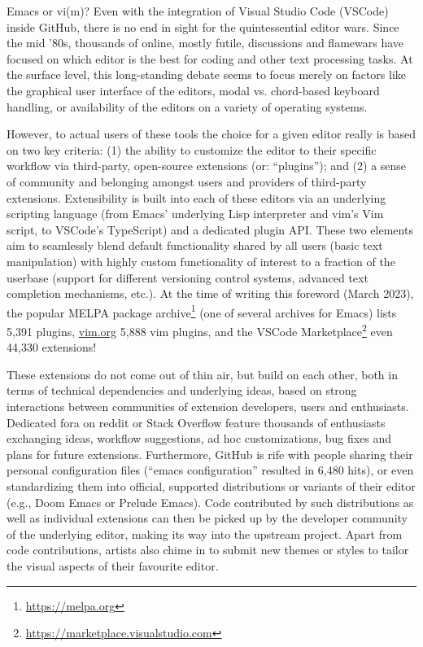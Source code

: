 %
%

\foreword

Emacs or vi(m)? Even with the integration of Visual Studio Code (VSCode) inside GitHub, there is no end in sight for the quintessential editor wars. Since the mid '80s, thousands of online, mostly futile, discussions and flamewars have focused on which editor is the best for coding and other text processing tasks. At the surface level, this long-standing debate seems to focus merely on factors like the graphical user interface of the editors, modal vs. chord-based keyboard handling, or availability of the editors on a variety of operating systems. 

However, to actual users of these tools the choice for a given editor really is based on two key criteria: (1) the ability to customize the editor to their specific workflow via third-party, open-source extensions (or: ``plugins''); and (2) a sense of community and belonging amongst users and providers of third-party extensions. Extensibility is built into each of these editors via an underlying scripting language (from Emacs' underlying Lisp interpreter and vim's Vim script, to VSCode's TypeScript) and a dedicated plugin API. These two elements aim to seamlessly blend default functionality shared by all users (basic text manipulation) with highly custom functionality of interest to a fraction of the userbase (support for different versioning control systems, advanced text completion mechanisms, etc.). At the time of writing this foreword (March 2023), the popular MELPA package archive\footnote{\url{https://melpa.org}} (one of several archives for Emacs) lists 5,391 plugins, \url{vim.org} 5,888 vim plugins, and the VSCode Marketplace\footnote{\url{https://marketplace.visualstudio.com}} even 44,330 extensions!

These extensions do not come out of thin air, but build on each other, both in terms of technical dependencies and underlying ideas, based on strong interactions between communities of extension developers, users and enthusiasts. Dedicated fora on reddit or Stack Overflow feature thousands of enthusiasts exchanging ideas, workflow suggestions, ad hoc customizations, bug fixes and plans for future extensions. Furthermore, GitHub is rife with people sharing their personal configuration files (``emacs configuration'' resulted in 6,480 hits), or even standardizing them into official, supported distributions or variants of their editor (e.g., Doom Emacs or Prelude Emacs). Code contributed by such distributions as well as individual extensions can then be picked up by the developer community of the underlying editor, making its way into the upstream project. Apart from code contributions, artists also chime in to submit new themes or styles to tailor the visual aspects of their favourite editor.

